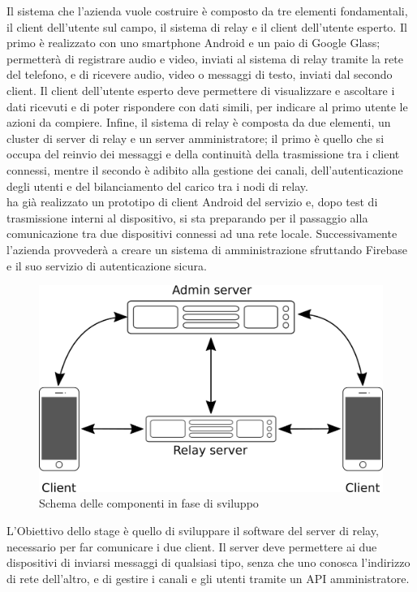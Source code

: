    Il sistema che l'azienda vuole costruire è composto da tre elementi fondamentali, il client dell'utente sul campo, il sistema di relay e il client dell'utente esperto. Il primo è realizzato con uno smartphone Android e un paio di Google Glass; permetterà di registrare audio e video, inviati al sistema di relay tramite la rete del telefono, e di ricevere audio, video o messaggi di testo, inviati dal secondo client. Il client dell'utente esperto deve permettere di visualizzare e ascoltare i dati ricevuti e di poter rispondere con dati simili, per indicare al primo utente le azioni da compiere. Infine, il sistema di relay è composta da due elementi, un cluster di server di relay e un server amministratore; il primo è quello che si occupa del reinvio dei messaggi e della continuità della trasmissione tra i client connessi, mentre il secondo è adibito alla gestione dei canali, dell'autenticazione degli utenti e del bilanciamento del carico tra i nodi di relay.
   \\
   \nomeAzienda{} ha già realizzato un prototipo di client Android del servizio e, dopo test di trasmissione interni al dispositivo, si sta preparando per il passaggio alla comunicazione tra due dispositivi connessi ad una rete locale. Successivamente l'azienda provvederà a creare un sistema di amministrazione sfruttando Firebase e il suo servizio di autenticazione sicura.
   \begin{figure}[H]
      \begin{center}
         \includegraphics[width=12cm,keepaspectratio]{immagini/erastreaming-schema-attuale}
      \end{center}
      \caption{Schema delle componenti in fase di sviluppo}
   \end{figure}
   L'Obiettivo dello stage è quello di sviluppare il software del server di relay, necessario per far comunicare i due client. Il server deve permettere ai due dispositivi di inviarsi messaggi di qualsiasi tipo, senza che uno conosca l'indirizzo di rete dell'altro, e di gestire i canali e gli utenti tramite un \gls{API} amministratore.
   
